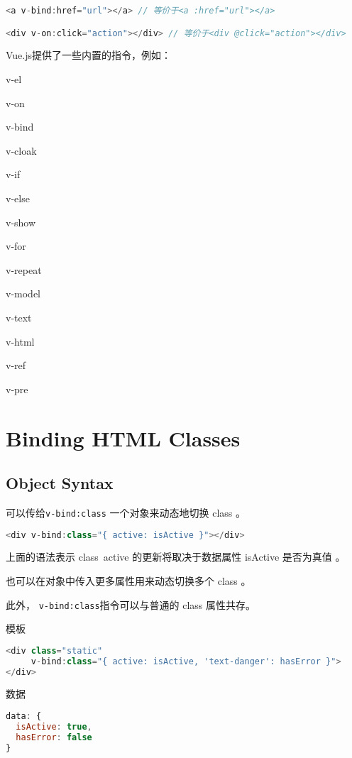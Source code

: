 \begin{lstlisting}[language=JavaScript]
<a v-bind:href="url"></a> // 等价于<a :href="url"></a>

<div v-on:click="action"></div> // 等价于<div @click="action"></div>
\end{lstlisting}



Vue.js提供了一些内置的指令，例如：

\begin{compactitem}
\item v-el
\item v-on
\item v-bind
\item v-cloak
\item v-if
\item v-else
\item v-show
\item v-for
\item v-repeat
\item v-model
\item v-text
\item v-html
\item v-ref
\item v-pre
\end{compactitem}




\section{Binding HTML Classes}



\subsection{Object Syntax}

可以传给\texttt{v-bind:class} 一个对象来动态地切换 class 。

\begin{lstlisting}[language=JavaScript]
<div v-bind:class="{ active: isActive }"></div>
\end{lstlisting}

上面的语法表示 class~active 的更新将取决于数据属性 isActive 是否为真值 。

也可以在对象中传入更多属性用来动态切换多个 class 。

此外， \texttt{v-bind:class}指令可以与普通的 class 属性共存。

\begin{compactitem}
\item 模板

\begin{lstlisting}[language=JavaScript]
<div class="static"
     v-bind:class="{ active: isActive, 'text-danger': hasError }">
</div>
\end{lstlisting}

\item 数据

\begin{lstlisting}[language=JavaScript]
data: {
  isActive: true,
  hasError: false
}
\end{lstlisting}
\end{compactitem}



